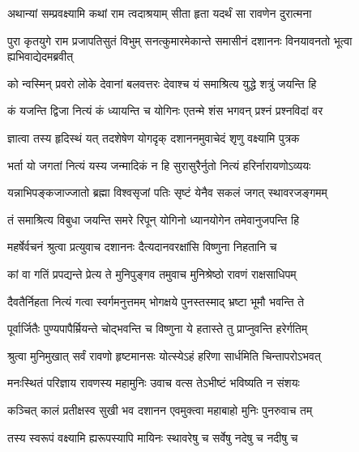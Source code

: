 

\addtocounter{shlokacount}{28}

\twolineshloka
{अथान्यां सम्प्रवक्ष्यामि कथां राम त्वदाश्रयाम्}
{सीता हृता यदर्थं सा रावणेन दुरात्मना} %

\threelineshloka
{पुरा कृतयुगे राम प्रजापतिसुतं विभुम्}
{सनत्कुमारमेकान्ते समासीनं दशाननः}
{विनयावनतो भूत्वा ह्यभिवाद्येदमब्रवीत्} %

\twolineshloka
{को न्वस्मिन् प्रवरो लोके देवानां बलवत्तरः}
{देवाश्च यं समाश्रित्य युद्धे शत्रुं जयन्ति हि} %

\twolineshloka
{कं यजन्ति द्विजा नित्यं कं ध्यायन्ति च योगिनः}
{एतन्मे शंस भगवन् प्रश्नं प्रश्नविदां वर} %

\twolineshloka
{ज्ञात्वा तस्य हृदिस्थं यत् तदशेषेण योगदृक्}
{दशाननमुवाचेदं शृणु वक्ष्यामि पुत्रक} %

\twolineshloka
{भर्ता यो जगतां नित्यं यस्य जन्मादिकं न हि}
{सुरासुरैर्नुतो नित्यं हरिर्नारायणोऽव्ययः} %

\twolineshloka
{यन्नाभिपङ्कजाज्जातो ब्रह्मा विश्वसृजां पतिः}
{सृष्टं येनैव सकलं जगत् स्थावरजङ्गमम्} %

\twolineshloka
{तं समाश्रित्य विबुधा जयन्ति समरे रिपून्}
{योगिनो ध्यानयोगेन तमेवानुजपन्ति हि} %

\twolineshloka
{महर्षेर्वचनं श्रुत्वा प्रत्युवाच दशाननः}
{दैत्यदानवरक्षांसि विष्णुना निहतानि च} %

\twolineshloka
{कां वा गतिं प्रपद्यन्ते प्रेत्य ते मुनिपुङ्गव}
{तमुवाच मुनिश्रेष्ठो रावणं राक्षसाधिपम्} %

\twolineshloka
{दैवतैर्निहता नित्यं गत्वा स्वर्गमनुत्तमम्}
{भोगक्षये पुनस्तस्माद् भ्रष्टा भूमौ भवन्ति ते} %

\twolineshloka
{पूर्वार्जितैः पुण्यपापैर्म्रियन्ते चोद्भवन्ति च}
{विष्णुना ये हतास्ते तु प्राप्नुवन्ति हरेर्गतिम्} %

\twolineshloka
{श्रुत्वा मुनिमुखात् सर्वं रावणो हृष्टमानसः}
{योत्स्येऽहं हरिणा सार्धमिति चिन्तापरोऽभवत्} %

\twolineshloka
{मनःस्थितं परिज्ञाय रावणस्य महामुनिः}
{उवाच वत्स तेऽभीष्टं भविष्यति न संशयः} %

\twolineshloka
{कञ्चित् कालं प्रतीक्षस्व सुखी भव दशानन}
{एवमुक्त्वा महाबाहो मुनिः पुनरुवाच तम्} %

\twolineshloka
{तस्य स्वरूपं वक्ष्यामि ह्यरूपस्यापि मायिनः}
{स्थावरेषु च सर्वेषु नदेषु च नदीषु च} %

